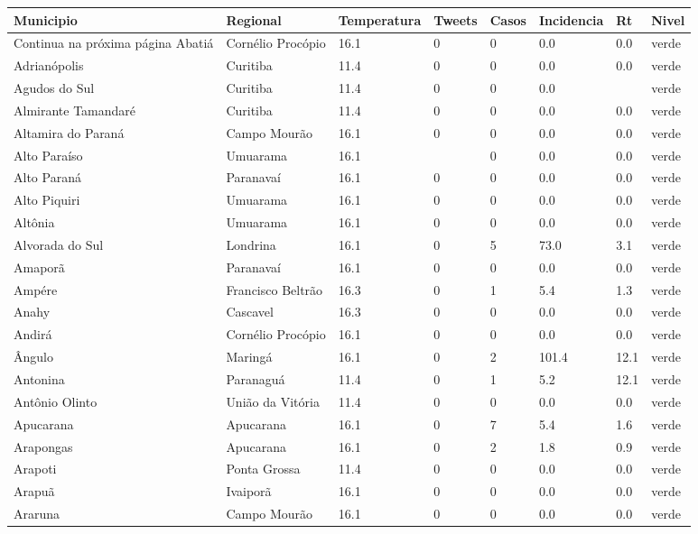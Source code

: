 \begin{longtable}{l|lllllll}
  \hline
Municipio & Regional & Temperatura & Tweets & Casos & Incidencia & Rt & Nivel \\ 
  \hline
\endhead
\hline
{\footnotesize Continua na próxima página}
\endfoot
\endlastfoot
Abatiá & Cornélio Procópio & 16.1 & 0 & 0 & 0.0 & 0.0 & verde \\ 
  Adrianópolis & Curitiba & 11.4 & 0 & 0 & 0.0 & 0.0 & verde \\ 
  Agudos do Sul & Curitiba & 11.4 & 0 & 0 & 0.0 &  & verde \\ 
  Almirante Tamandaré & Curitiba & 11.4 & 0 & 0 & 0.0 & 0.0 & verde \\ 
  Altamira do Paraná & Campo Mourão & 16.1 & 0 & 0 & 0.0 & 0.0 & verde \\ 
  Alto Paraíso & Umuarama & 16.1 &  & 0 & 0.0 & 0.0 & verde \\ 
  Alto Paraná & Paranavaí & 16.1 & 0 & 0 & 0.0 & 0.0 & verde \\ 
  Alto Piquiri & Umuarama & 16.1 & 0 & 0 & 0.0 & 0.0 & verde \\ 
  Altônia & Umuarama & 16.1 & 0 & 0 & 0.0 & 0.0 & verde \\ 
  Alvorada do Sul & Londrina & 16.1 & 0 & 5 & 73.0 & 3.1 & verde \\ 
  Amaporã & Paranavaí & 16.1 & 0 & 0 & 0.0 & 0.0 & verde \\ 
  Ampére & Francisco Beltrão & 16.3 & 0 & 1 & 5.4 & 1.3 & verde \\ 
  Anahy & Cascavel & 16.3 & 0 & 0 & 0.0 & 0.0 & verde \\ 
  Andirá & Cornélio Procópio & 16.1 & 0 & 0 & 0.0 & 0.0 & verde \\ 
  Ângulo & Maringá & 16.1 & 0 & 2 & 101.4 & 12.1 & verde \\ 
  Antonina & Paranaguá & 11.4 & 0 & 1 & 5.2 & 12.1 & verde \\ 
  Antônio Olinto & União da Vitória & 11.4 & 0 & 0 & 0.0 & 0.0 & verde \\ 
  Apucarana & Apucarana & 16.1 & 0 & 7 & 5.4 & 1.6 & verde \\ 
  Arapongas & Apucarana & 16.1 & 0 & 2 & 1.8 & 0.9 & verde \\ 
  Arapoti & Ponta Grossa & 11.4 & 0 & 0 & 0.0 & 0.0 & verde \\ 
  Arapuã & Ivaiporã & 16.1 & 0 & 0 & 0.0 & 0.0 & verde \\ 
  Araruna & Campo Mourão & 16.1 & 0 & 0 & 0.0 & 0.0 & verde \\ 

\end{longtable}
